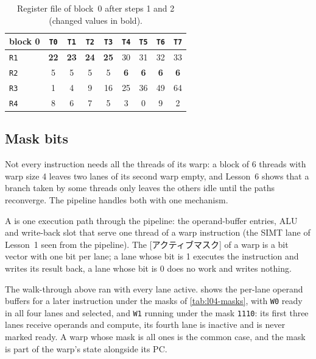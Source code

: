 \documentclass[../main.tex]{subfiles}
\begin{document}
\begin{table}[htbp]
  \centering
  \caption{Register file of block~0 after steps 1 and 2 (changed values
    in bold).}
  \label{tab:l04-walkthrough-after}
  \begin{tabular}{lcccccccc}
    \toprule
    block 0 & \texttt{T0} & \texttt{T1} & \texttt{T2} & \texttt{T3} & \texttt{T4} & \texttt{T5} & \texttt{T6} & \texttt{T7} \\
    \midrule
    \texttt{R1} & \textbf{22} & \textbf{23} & \textbf{24} & \textbf{25} & 30 & 31 & 32 & 33 \\
    \texttt{R2} &  5 &  5 &  5 &  5 & \textbf{6} & \textbf{6} & \textbf{6} & \textbf{6} \\
    \texttt{R3} &  1 &  4 &  9 & 16 & 25 & 36 & 49 & 64 \\
    \texttt{R4} &  8 &  6 &  7 &  5 &  3 &  0 &  9 &  2 \\
    \bottomrule
  \end{tabular}
\end{table}

\subsection{Mask bits}

Not every instruction needs all the threads of its warp: a block of 6
threads with warp size 4 leaves two lanes of its second warp empty, and
Lesson~6 shows that a branch taken by some threads only leaves the
others idle until the paths reconverge.  The pipeline handles both with
one mechanism.

\begin{definition}
  \label{def:l04-active-mask}
  A  is one execution path through the pipeline:
  the operand-buffer entries, ALU and write-back slot that serve one
  thread of a warp instruction (the SIMT lane of Lesson~1 seen from the
  pipeline).  The [アクティブマスク] of a warp is a bit
  vector with one bit per lane; a lane whose bit is 1 executes the
  instruction and writes its result back, a lane whose bit is 0 does
  no work and writes nothing.
\end{definition}

The walk-through above ran with every lane active.
 shows the per-lane operand buffers for
a later instruction under the masks of \cref{tab:l04-masks}, with
\texttt{W0} ready in all four lanes and selected, and \texttt{W1}
running under the mask \texttt{1110}: its first three
lanes receive operands and compute, its fourth lane is inactive and is
never marked ready.  A warp whose mask is all ones is the common case,
and the mask is part of the warp's state alongside its PC.
\end{document}
